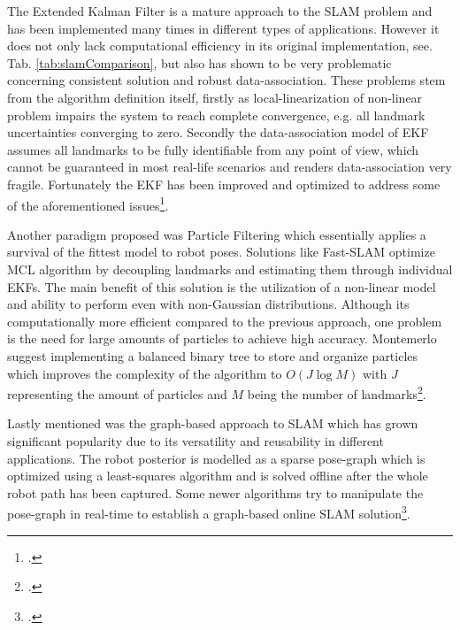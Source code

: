 The Extended Kalman Filter is a mature approach to the SLAM problem and has been implemented many times in different types of applications. However it does not only lack computational efficiency in its original implementation, see. Tab. \ref{tab:slamComparison}, but also has shown to be very problematic concerning consistent solution and robust data-association. 
These problems stem from the algorithm definition itself, firstly as local-linearization of non-linear problem impairs the system to reach complete convergence, e.g. all landmark uncertainties converging to zero. Secondly the data-association model of EKF assumes all landmarks to be fully identifiable from any point of view, which cannot be guaranteed in most real-life scenarios and renders data-association very fragile.
Fortunately the EKF has been improved and optimized to address some of the aforementioned issues\footcite{bailey2006simultaneous}.

Another paradigm proposed was Particle Filtering which essentially applies a survival of the fittest model to robot poses. Solutions like Fast-SLAM optimize MCL algorithm by decoupling landmarks and estimating them through individual EKFs. 
The main benefit of this solution is the utilization of a non-linear model and ability to perform even with non-Gaussian distributions. 
Although its computationally more efficient compared to the previous approach, one problem is the need for large amounts of particles to achieve high accuracy. Montemerlo suggest implementing a balanced binary tree to store and organize particles which improves the complexity of the algorithm to $O(J  \log  M)$ with $J$ representing the amount of particles and $M$ being the number of landmarks\footcite{montemerlo2002fastslam}.

Lastly mentioned was the graph-based approach to SLAM which has grown significant popularity due to its versatility and reusability in different applications. The robot posterior is modelled as a sparse pose-graph which is optimized using a least-squares algorithm and is solved offline after the whole robot path has been captured. Some newer algorithms try to manipulate the pose-graph in real-time to establish a graph-based online SLAM solution\footcite{stachniss2016simultaneous}.


